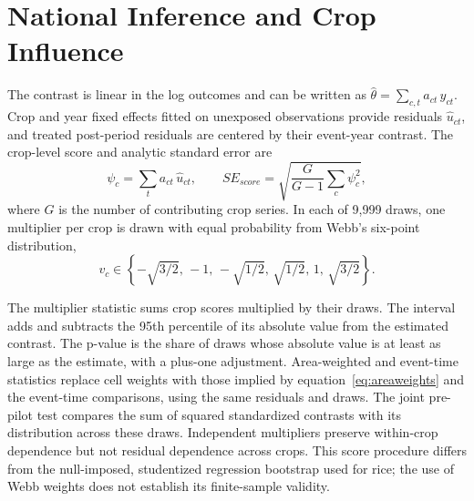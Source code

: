 \chapter{National Inference and Crop Influence}\label{app:inference}

\setcounter{equation}{0}
\setcounter{table}{0}
\setcounter{figure}{0}
\renewcommand{\theequation}{A\arabic{equation}}
\renewcommand{\thetable}{A\arabic{table}}
\renewcommand{\thefigure}{A\arabic{figure}}

The contrast is linear in the log outcomes and can be written as $\widehat{\theta} = \sum_{c,t}a_{ct}\, y_{ct}$. Crop and year fixed effects fitted on unexposed observations provide residuals $\widehat{u}_{ct}$, and treated post-period residuals are centered by their event-year contrast. The crop-level score and analytic standard error are
\begin{equation}\label{eq:score}
\psi_{c} = \sum_{t}a_{ct}\,\widehat{u}_{ct},\qquad SE_{score} = \sqrt{\frac{G}{G - 1}\sum_{c}\psi_{c}^{2}},
\end{equation}
where $G$ is the number of contributing crop series. In each of 9,999 draws, one multiplier per crop is drawn with equal probability from Webb's \citeyearpar{webb2023} six-point distribution,
\begin{equation}\label{eq:webb}
v_{c} \in \left\{ -\sqrt{3/2},\, -1,\, -\sqrt{1/2},\,\sqrt{1/2},\, 1,\,\sqrt{3/2} \right\}.
\end{equation}

The multiplier statistic sums crop scores multiplied by their draws. The interval adds and subtracts the 95th percentile of its absolute value from the estimated contrast. The p-value is the share of draws whose absolute value is at least as large as the estimate, with a plus-one adjustment. Area-weighted and event-time statistics replace cell weights with those implied by equation~\eqref{eq:areaweights} and the event-time comparisons, using the same residuals and draws. The joint pre-pilot test compares the sum of squared standardized contrasts with its distribution across these draws. Independent multipliers preserve within-crop dependence but not residual dependence across crops. This score procedure differs from the null-imposed, studentized regression bootstrap used for rice; the use of Webb weights does not establish its finite-sample validity.

